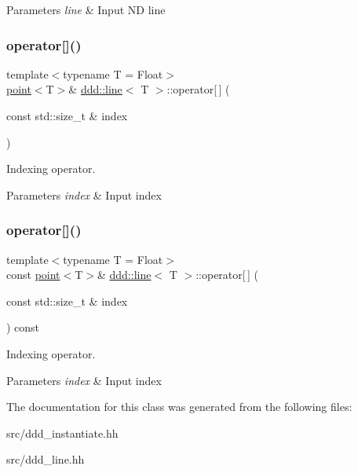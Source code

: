 \begin{DoxyParams}{Parameters}
{\em line} & Input ND line \\
\hline
\end{DoxyParams}
\mbox{\label{classddd_1_1line_a04a2abe2c302b5ca97074116b2c39499}} 
\subsubsection{\texorpdfstring{operator[]()}{operator[]()}\hspace{0.1cm}{\footnotesize\ttfamily [1/2]}}
{\footnotesize\ttfamily template$<$typename T = Float$>$ \\
\hyperlink{classddd_1_1point}{point}$<$T$>$\& \hyperlink{classddd_1_1line}{ddd\+::line}$<$ T $>$\+::operator\mbox{[}$\,$\mbox{]} (\begin{DoxyParamCaption}\item[{const std\+::size\+\_\+t \&}]{index }\end{DoxyParamCaption})\hspace{0.3cm}{\ttfamily [inline]}}



Indexing operator. 


\begin{DoxyParams}{Parameters}
{\em index} & Input index \\
\hline
\end{DoxyParams}
\mbox{\label{classddd_1_1line_af12bf431234fac2996ca667ee4f70f3a}} 
\subsubsection{\texorpdfstring{operator[]()}{operator[]()}\hspace{0.1cm}{\footnotesize\ttfamily [2/2]}}
{\footnotesize\ttfamily template$<$typename T = Float$>$ \\
const \hyperlink{classddd_1_1point}{point}$<$T$>$\& \hyperlink{classddd_1_1line}{ddd\+::line}$<$ T $>$\+::operator\mbox{[}$\,$\mbox{]} (\begin{DoxyParamCaption}\item[{const std\+::size\+\_\+t \&}]{index }\end{DoxyParamCaption}) const\hspace{0.3cm}{\ttfamily [inline]}}



Indexing operator. 


\begin{DoxyParams}{Parameters}
{\em index} & Input index \\
\hline
\end{DoxyParams}


The documentation for this class was generated from the following files\+:\begin{DoxyCompactItemize}
\item 
src/ddd\+\_\+instantiate.\+hh\item 
src/ddd\+\_\+line.\+hh\end{DoxyCompactItemize}
